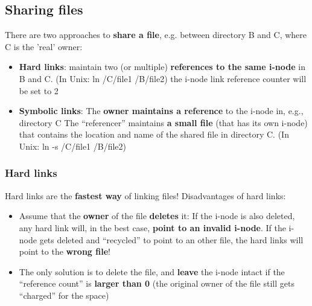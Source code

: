 \documentclass{article}
\begin{document}
\subsection{Sharing files}
\begin{flushleft}
There are two approaches to \textbf{share a file}, e.g. between directory B and C, where C is the ’real’ owner:
\begin{itemize}
	\item \textbf{Hard links}: maintain two (or multiple) \textbf{references to the same i-node} in B and C. (In Unix: ln /C/file1 /B/file2) the i-node link reference counter will be set to 2
	\item \textbf{Symbolic links}: The \textbf{owner maintains a reference} to the i-node in, e.g., directory C The “referencer” maintains \textbf{a small file} (that has its own i-node) that contains the location and name of the shared file in directory C. (In Unix: ln -s /C/file1 /B/file2)
\end{itemize}
\end{flushleft}

\subsubsection{Hard links}
\begin{flushleft}
Hard links are the \textbf{fastest way} of linking files! Disadvantages of hard links:
\begin{itemize}
	\item Assume that the \textbf{owner} of the file \textbf{deletes} it: If the i-node is also deleted, any hard link will, in the best case, \textbf{point to an invalid i-node}. If the i-node gets deleted and “recycled” to point to an other file, the hard links will point to the \textbf{wrong file}!
	\item The only solution is to delete the file, and \textbf{leave} the i-node intact if the “reference count” is \textbf{larger than 0} (the original owner of the file still gets “charged” for the space)
\end{itemize}
\end{flushleft}
\end{document}
